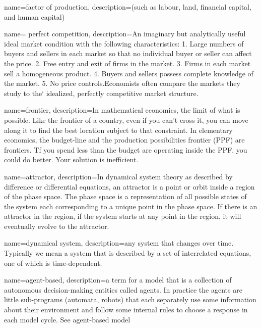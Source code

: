 {
name=factor of production,
description={(such as labour, land, financial capital,  and human capital)}
}

{
name= perfect competition,
description={An imaginary but analytically useful ideal market condition with the following  characteristics: 1. Large numbers of buyers and sellers in each market so that no individual buyer or seller can affect the price. 2. Free entry and exit of firms in the market. 3. Firms in each market sell a homogeneous product. 4. Buyers and sellers possess complete knowledge of the market. 5. No price controls.\newline  Economists often compare the markets they study to the` idealized, perfectly competitive market structure.}
}

{
name=frontier,
description={In mathematical economics, the limit of what is possible. Like the frontier of a country, even if you can't cross it, you can move along it to find the best location  subject to that constraint. In elementary economics, the budget-line and the production possibilities frontier (PPF) are  frontiers. Tf you spend less than the budget are operating inside the PPF, you could do better. Your solution is inefficient. }
}

{
name=attractor,
description={In \gls{dynamical system} theory as described by difference or differential equations, an attractor is a point or orbit inside a region of the phase space. The phase space is a representation of all possible states of the system each corresponding to a unique point in the phase space. If there is an attractor in the region, if the system starts at any point in the region,  it will eventually evolve to the attractor.}
}

{
name=dynamical system,
description={any system that changes over time. Typically we mean a  system that is described by a set of interrelated equations, one of which is time-dependent. }
}

{
name=agent-based,
description={a term for a model that is a  collection of autonomous decision-making entities called agents. In practice the agents are little sub-programs (automata, robots) that each separately use some information about their environment and follow some internal rules to choose a response in each model cycle. See \gls{agent-based model}}
}

